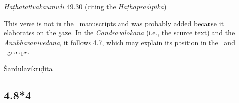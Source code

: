 \begin{ekdosis}
\begin{testimonia}[hp04_008_3]
\emph{Haṭhatattvakaumudī} 49.30 (citing the \emph{Haṭhapradīpikā})
\begin{versinnote}
\end{versinnote}

\end{testimonia}

\begin{philcomm}[hp04_008_3]
This verse is not in the \textalpha\ manuscripts and was probably added because it elaborates on the gaze. In the \emph{Candrāvalokana} (i.e., the source text) and the \emph{Anubhavanivedana}, it follows 4.7, which may explain its position in the \textgamma\ and \textdelta\ groups.
\end{philcomm}


\begin{metre}[hp04_008_3]
Śārdūlavikrīḍita 
\end{metre}

\subsection*{4.8*4}




\end{ekdosis}
